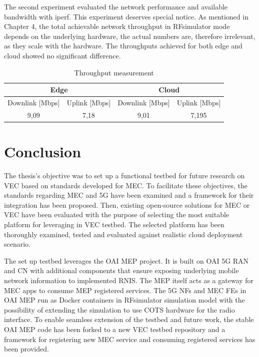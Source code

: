 \documentclass[12pt,a4paper,twoside]{report}
\begin{document}
The second experiment evaluated the network performance and available bandwidth with iperf. This experiment deserves special notice. As mentioned in Chapter 4, the total achievable network throughput in RFsimulator mode depends on the underlying hardware, the actual numbers are, therefore irrelevant, as they scale with the hardware. The throughputs achieved for both edge and cloud showed no significant difference.
\begin{table}[!ht]
    \centering
    \caption{Throughput measurement}
    \begin{tabular}{|c|c|c|c|}
    \hline
        \multicolumn{2}{|c|}{Edge} & \multicolumn{2}{c|}{Cloud} \\ \hline
        Downlink [Mbps] & Uplink [Mbps] & Downlink [Mbps] & Uplink [Mbps] \\ \hline
        9,09 & 7,18 & 9,01 & 7,195 \\ \hline
    \end{tabular}
    \label{T:throughput}
\end{table}
\chapter{Conclusion}
The thesis’s objective was to set up a functional testbed for future research on VEC based on standards developed for MEC. To facilitate these objectives, the standards regarding MEC and 5G have been examined and a framework for their integration has been proposed. Then, existing open-source solutions for MEC or VEC have been evaluated with the purpose of selecting the most suitable platform for leveraging in VEC testbed. The selected platform has been thoroughly examined, tested and evaluated against realistic cloud deployment scenario. 

The set up testbed leverages the OAI MEP project. It is built on OAI 5G RAN and CN with additional components that ensure exposing underlying mobile network information to implemented RNIS. The MEP itself acts as a gateway for MEC apps to consume MEP registered services. The 5G NFs and MEC FEs in OAI MEP run as Docker containers in RFsimulator simulation model with the possibility of extending the simulation to use COTS hardware for the radio interface. To enable seamless extension of the testbed and future work, the stable OAI MEP code has been forked to a new VEC testbed repository and a framework for registering new MEC service and consuming registered services has been provided. 
\end{document}
